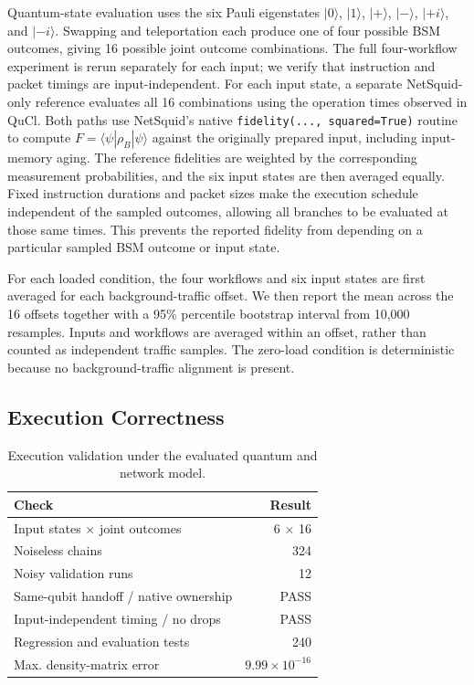 Quantum-state evaluation uses the six Pauli eigenstates
$|0\rangle$, $|1\rangle$, $|+\rangle$, $|-\rangle$, $|+i\rangle$,
and $|-i\rangle$. Swapping and teleportation each produce one of four
possible BSM outcomes, giving 16 possible joint outcome combinations.
The full four-workflow experiment is rerun separately for each input;
we verify that instruction and packet timings are input-independent.
For each input state, a separate NetSquid-only reference evaluates all
16 combinations using the operation times observed in QuCl. Both paths
use NetSquid's native \texttt{fidelity(..., squared=True)} routine to
compute $F=\langle\psi|\rho_B|\psi\rangle$ against the originally
prepared input, including input-memory aging. The reference fidelities
are weighted by the corresponding measurement probabilities, and the
six input states are then averaged equally. Fixed instruction durations
and packet sizes make the execution schedule independent of the sampled
outcomes, allowing all branches to be evaluated at those same times.
This prevents the reported fidelity from depending on a particular
sampled BSM outcome or input state.

For each loaded condition, the four workflows and six input states are
first averaged for each background-traffic offset. We then report the
mean across the 16 offsets together with a 95\% percentile bootstrap
interval from 10,000 resamples. Inputs and workflows are averaged within
an offset, rather than counted as independent traffic samples.
The zero-load condition is deterministic because no background-traffic
alignment is present.

\subsection{Execution Correctness}
\label{subsec:eval-correctness}

\begin{table}[t]
\centering
\caption{Execution validation under the evaluated quantum and network model.}
\label{tab:qucl-validation}
\small
\begin{tabular}{@{}lr@{}}
\toprule
Check & Result \\
\midrule
Input states $\times$ joint outcomes & 6 $\times$ 16 \\
Noiseless chains & 324 \\
Noisy validation runs & 12 \\
Same-qubit handoff / native ownership & PASS \\
Input-independent timing / no drops & PASS \\
Regression and evaluation tests & 240 \\
Max. density-matrix error & $9.99\times 10^{-16}$ \\
\bottomrule
\end{tabular}
\end{table}

